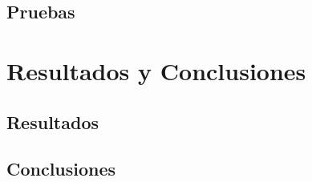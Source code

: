 \documentclass[12pt,letterpaper,spanish]{report}
\begin{document}
\section{Pruebas}



\chapter{Resultados y Conclusiones}
\newpage

\section{Resultados}


\section{Conclusiones}



\newpage

\appendix

\nocite{book}
\nocite{dura2022saas}
\nocite{pretell2024mejora}
\nocite{odooDocs}
\nocite{book}


%
%






\end{document}
